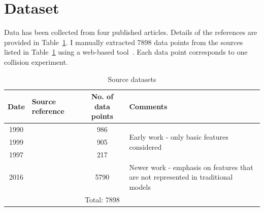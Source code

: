 \documentclass{article}
\begin{document}

\clearpage
\section{Dataset}


Data has been collected from four published articles. Details of the references are provided in Table~\ref{tab:data}. I manually extracted 7898 data points from the sources listed in Table~\ref{tab:data} using a web-based tool~\cite{rohatgi2011webplotdigitizer}. Each data point corresponds to one collision experiment.

\begin{table}[h]
  \caption{Source datasets}
  \label{tab:data}
  \centering
  \begin{tabular}{c l c p{5cm}}
    \toprule
    Date  & Source reference      				& No. of data points  & Comments\\
    \midrule
    1990 & \citet{ashgriz1990coalescence}     		& 986   &  \multirow{3}{5cm}{Early work - only basic features considered} \\
    1999 & \citet{estrade1999experimental} 		& 905   & \\ 
    1997 & \citet{qian1997regimes}    			& 217   & \\
    2016 & \citet{sommerfeld2016modelling}  		& 5790 & Newer work - emphasis on features that are not represented in traditional models\\
    \cmidrule(r){3-3}
             & 									& Total: 7898 & \\
    \bottomrule
  \end{tabular}
\end{table}
\end{document}
